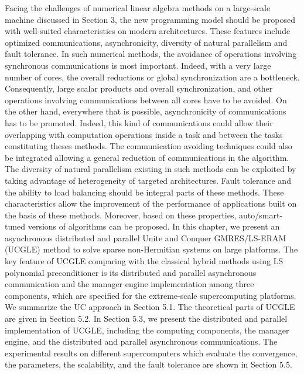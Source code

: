 \begin{displayquote}
	
	\textsf{Facing the challenges of numerical linear algebra methods on a large-scale machine discussed in Section 3, the new programming model should be proposed with well-suited characteristics on modern architectures. These features include optimized communications, asynchronicity, diversity of natural parallelism and fault tolerance. In such numerical methods, the avoidance of operations involving synchronous communications is most important. Indeed, with a very large number of cores, the overall reductions or global synchronization are a bottleneck. Consequently, large scalar products and overall synchronization, and other operations involving communications between all cores have to be avoided. On the other hand, everywhere that is possible, asynchronicity of communications has to be promoted. Indeed, this kind of communications could allow their overlapping with computation operations inside a task and between the tasks constituting theses methods. The communication avoiding techniques could also be integrated allowing a general reduction of communications in the algorithm. The diversity of natural parallelism existing in such methods can be exploited by taking advantage of heterogeneity of targeted architectures. Fault tolerance and the ability to load balancing should be integral parts of these methods. These characteristics allow the improvement of the performance of applications built on the basis of these methods. Moreover, based on these properties, auto/smart-tuned versions of algorithms can be proposed. In this chapter, we present an asynchronous distributed and parallel Unite and Conquer GMRES/LS-ERAM (UCGLE) method to solve sparse non-Hermitian systems on large platforms. The key feature of UCGLE comparing with the classical hybrid methods using LS polynomial preconditioner \cite{essai1999heterogeneous,he2006hybrid} is its distributed and parallel asynchronous communication and the manager engine implementation among three components, which are specified for the extreme-scale supercomputing platforms. We summarize the UC approach in Section 5.1. The theoretical parts of UCGLE are given in Section 5.2. In Section 5.3, we present the distributed and parallel implementation of UCGLE, including the computing components, the manager engine, and the distributed and parallel asynchronous communications. The experimental results on different supercomputers which evaluate the convergence, the parameters, the scalability, and the fault tolerance are shown in Section 5.5.}
\end{displayquote}

